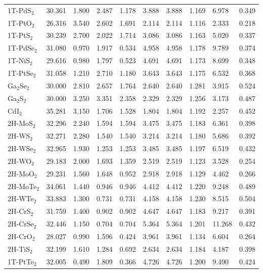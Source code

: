 \begin{center}
\begin{tabularx}{1.1\linewidth}{lXXXXXXXXX}
    1T-PdS$_{2}$ & 30.361  & 1.800  & 2.487  & 1.178  & 3.888  & 3.888  & 1.169  & 6.978  & 0.349 \\
    1T-PtO$_{2}$ & 26.316  & 3.540  & 2.602  & 1.691  & 2.114  & 2.114  & 1.116  & 2.333  & 0.218 \\
    1T-PtS$_{2}$ & 30.239  & 2.700  & 2.022  & 1.714  & 3.086  & 3.086  & 1.163  & 5.020  & 0.337 \\
    1T-PdSe$_{2}$ & 31.080  & 0.970  & 1.917  & 0.534  & 4.958  & 4.958  & 1.178  & 9.789  & 0.374 \\
    1T-NiS$_{2}$ & 29.616  & 0.980  & 1.797  & 0.523  & 4.691  & 4.691  & 1.173  & 8.699  & 0.348 \\
    1T-PtSe$_{2}$ & 31.058  & 1.210  & 2.710  & 1.180  & 3.643  & 3.643  & 1.175  & 6.532  & 0.368 \\
    Ga$_{2}$Se$_{2}$ & 30.000  & 2.810  & 2.657  & 1.764  & 2.640  & 2.640  & 1.281  & 3.915  & 0.524 \\
    Ga$_{2}$S$_{2}$ & 30.000  & 3.250  & 3.351  & 2.358  & 2.329  & 2.329  & 1.256  & 3.173  & 0.487 \\
    CdI$_{2}$ & 35.281  & 3.150  & 1.706  & 1.528  & 1.804  & 1.804  & 1.192  & 2.257  & 0.452 \\
    2H-MoS$_{2}$ & 32.296  & 2.240  & 1.594  & 1.594  & 3.475  & 3.475  & 1.183  & 6.361  & 0.398 \\
    2H-WS$_{2}$ & 32.271  & 2.280  & 1.540  & 1.540  & 3.214  & 3.214  & 1.180  & 5.686  & 0.392 \\
    2H-WSe$_{2}$ & 32.965  & 1.930  & 1.253  & 1.253  & 3.485  & 3.485  & 1.197  & 6.519  & 0.432 \\
    2H-WO$_{2}$ & 29.183  & 2.000  & 1.693  & 1.359  & 2.519  & 2.519  & 1.123  & 3.528  & 0.254 \\
    2H-MoO$_{2}$ & 29.231  & 1.560  & 1.648  & 0.952  & 2.918  & 2.918  & 1.129  & 4.462  & 0.266 \\
    2H-MoTe$_{2}$ & 34.061  & 1.440  & 0.946  & 0.946  & 4.412  & 4.412  & 1.220  & 9.248  & 0.489 \\
    2H-WTe$_{2}$ & 33.883  & 1.300  & 0.731  & 0.731  & 4.158  & 4.158  & 1.230  & 8.515  & 0.504 \\
    2H-CrS$_{2}$ & 31.759  & 1.400  & 0.902  & 0.902  & 4.647  & 4.647  & 1.183  & 9.217  & 0.391 \\
    2H-CrSe$_{2}$ & 32.446  & 1.150  & 0.704  & 0.704  & 5.364  & 5.364  & 1.201  & 11.268  & 0.432 \\
    2H-CrO$_{2}$ & 28.027  & 0.990  & 1.596  & 0.424  & 3.961  & 3.961  & 1.134  & 6.604  & 0.264 \\
    2H-TiS$_{2}$ & 32.199  & 1.610  & 1.284  & 0.692  & 2.634  & 2.634  & 1.184  & 4.187  & 0.398 \\
    1T-PtTe$_{2}$ & 32.005  & 0.490  & 1.809  & 0.366  & 4.726  & 4.726  & 1.200  & 9.490  & 0.424 \\
    \hline
  \end{tabularx}

\end{center}
% 
